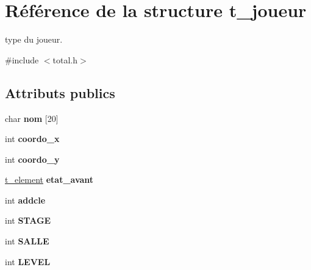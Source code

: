 \hypertarget{structt__joueur}{}\section{Référence de la structure t\+\_\+joueur}
\label{structt__joueur}


type du joueur.  




{\ttfamily \#include $<$total.\+h$>$}

\subsection*{Attributs publics}
\begin{DoxyCompactItemize}
\item 
char {\bfseries nom} \mbox{[}20\mbox{]}\hypertarget{structt__joueur_a064e13795b30484e6faa1738739bc7bc}{}\label{structt__joueur_a064e13795b30484e6faa1738739bc7bc}

\item 
int {\bfseries coordo\+\_\+x}\hypertarget{structt__joueur_a987d204c2c8f75dc8c86c3c7cb068925}{}\label{structt__joueur_a987d204c2c8f75dc8c86c3c7cb068925}

\item 
int {\bfseries coordo\+\_\+y}\hypertarget{structt__joueur_a7323e5698a0c73ec7c832e04aecfd6aa}{}\label{structt__joueur_a7323e5698a0c73ec7c832e04aecfd6aa}

\item 
\hyperlink{total_8h_a8b071baf43ce73c99f88fc8169b0514d}{t\+\_\+element} {\bfseries etat\+\_\+avant}\hypertarget{structt__joueur_a1bca9feb84458e2d91467c2cfe2726ce}{}\label{structt__joueur_a1bca9feb84458e2d91467c2cfe2726ce}

\item 
int {\bfseries addcle}\hypertarget{structt__joueur_a9968b8be2a2e33cf21326ea498e1f3c1}{}\label{structt__joueur_a9968b8be2a2e33cf21326ea498e1f3c1}

\item 
int {\bfseries S\+T\+A\+GE}\hypertarget{structt__joueur_a4f51a9801b83bc16f11b22b29014227c}{}\label{structt__joueur_a4f51a9801b83bc16f11b22b29014227c}

\item 
int {\bfseries S\+A\+L\+LE}\hypertarget{structt__joueur_af7c21acb1e1d31dcfa22965268391b7e}{}\label{structt__joueur_af7c21acb1e1d31dcfa22965268391b7e}

\item 
int {\bfseries L\+E\+V\+EL}\hypertarget{structt__joueur_a489ad8b9028b6ae20812e55db7e14596}{}\label{structt__joueur_a489ad8b9028b6ae20812e55db7e14596}


\end{DoxyCompactItemize}
